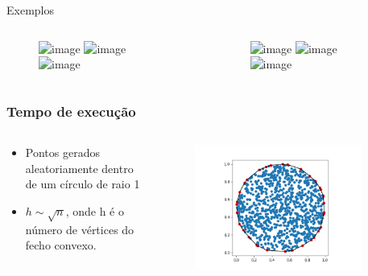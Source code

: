 \documentclass[aspectratio=169,usenames,dvipsnames]{beamer}
\begin{document}
\begin{frame}{Exemplos}
  \begin{overprint}
    \begin{columns}
      \begin{column}{0.5\textwidth}
        \begin{figure}
          \includegraphics<1-2>[width=\textwidth]{./figures/cartbs_pointsonly.png}
          \includegraphics<3-4>[width=\textwidth]{./figures/catholebs_pointsonly.png}
          \includegraphics<5-6>[width=\textwidth]{./figures/dog_pointsonly.png}
        \end{figure}
      \end{column}
      \begin{column}{0.5\textwidth}
        \begin{figure}
          \includegraphics<2>[width=\textwidth]{./figures/cartbs.png}
          \includegraphics<4>[width=\textwidth]{./figures/catholebs.png}
          \includegraphics<6>[width=\textwidth]{./figures/dog.png}
        \end{figure}
      \end{column}
    \end{columns}
  \end{overprint}
\end{frame}

\begin{frame}
\frametitle{Tempo de execução}
\begin{columns}
  \begin{column}{0.4\textwidth}
  \begin{itemize}
    \item Pontos gerados aleatoriamente dentro de um círculo de raio 1
    \item $h \sim \sqrt{n}$, onde h é o número de vértices do fecho convexo.
  \end{itemize}
  \end{column}
  \begin{column}{0.6\textwidth}
    \begin{figure}
      \includegraphics[width=0.9\textwidth]{./figures/random_merge_1000_1.png}
    \end{figure}
  \end{column}
\end{columns}
  
\end{frame}
\end{document}

